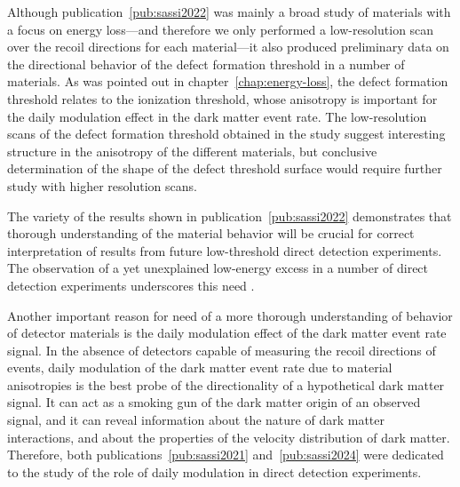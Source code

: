 Although publication~\ref{pub:sassi2022} was mainly a broad study of materials with a focus on energy loss---and therefore we only performed a low-resolution scan over the recoil directions for each material---it also produced preliminary data on the directional behavior of the defect formation threshold in a number of materials. As was pointed out in chapter~\ref{chap:energy-loss}, the defect formation threshold relates to the ionization threshold, whose anisotropy is important for the daily modulation effect in the dark matter event rate. The low-resolution scans of the defect formation threshold obtained in the study suggest interesting structure in the anisotropy of the different materials, but conclusive determination of the shape of the defect threshold surface would require further study with higher resolution scans.

The variety of the results shown in publication~\ref{pub:sassi2022} demonstrates that thorough understanding of the material behavior will be crucial for correct interpretation of results from future low-threshold direct detection experiments. The observation of a yet unexplained low-energy excess in a number of direct detection experiments underscores this need \parencites{CRESSTIII2019, DAMIC2020, EDELWEISS2020, NUCLEUS2020, SENSEI2020, SuperCDMS2020}.

Another important reason for need of a more thorough understanding of behavior of detector materials is the daily modulation effect of the dark matter event rate signal. In the absence of detectors capable of measuring the recoil directions of events, daily modulation of the dark matter event rate due to material anisotropies is the best probe of the directionality of a hypothetical dark matter signal. It can act as a smoking gun of the dark matter origin of an observed signal, and it can reveal information about the nature of dark matter interactions, and about the properties of the velocity distribution of dark matter. Therefore, both publications~\ref{pub:sassi2021} and~\ref{pub:sassi2024} were dedicated to the study of the role of daily modulation in direct detection experiments.

